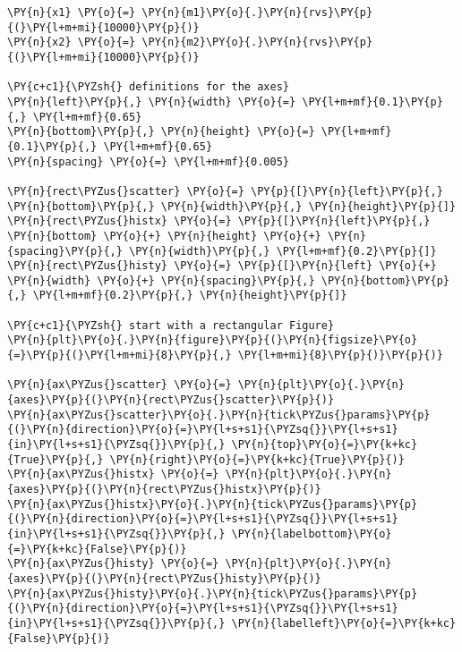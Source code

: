     \begin{tcolorbox}[breakable, size=fbox, boxrule=1pt, pad at break*=1mm,colback=cellbackground, colframe=cellborder]
\begin{Verbatim}[commandchars=\\\{\}]
\PY{n}{x1} \PY{o}{=} \PY{n}{m1}\PY{o}{.}\PY{n}{rvs}\PY{p}{(}\PY{l+m+mi}{10000}\PY{p}{)}
\PY{n}{x2} \PY{o}{=} \PY{n}{m2}\PY{o}{.}\PY{n}{rvs}\PY{p}{(}\PY{l+m+mi}{10000}\PY{p}{)}

\PY{c+c1}{\PYZsh{} definitions for the axes}
\PY{n}{left}\PY{p}{,} \PY{n}{width} \PY{o}{=} \PY{l+m+mf}{0.1}\PY{p}{,} \PY{l+m+mf}{0.65}
\PY{n}{bottom}\PY{p}{,} \PY{n}{height} \PY{o}{=} \PY{l+m+mf}{0.1}\PY{p}{,} \PY{l+m+mf}{0.65}
\PY{n}{spacing} \PY{o}{=} \PY{l+m+mf}{0.005}

\PY{n}{rect\PYZus{}scatter} \PY{o}{=} \PY{p}{[}\PY{n}{left}\PY{p}{,} \PY{n}{bottom}\PY{p}{,} \PY{n}{width}\PY{p}{,} \PY{n}{height}\PY{p}{]}
\PY{n}{rect\PYZus{}histx} \PY{o}{=} \PY{p}{[}\PY{n}{left}\PY{p}{,} \PY{n}{bottom} \PY{o}{+} \PY{n}{height} \PY{o}{+} \PY{n}{spacing}\PY{p}{,} \PY{n}{width}\PY{p}{,} \PY{l+m+mf}{0.2}\PY{p}{]}
\PY{n}{rect\PYZus{}histy} \PY{o}{=} \PY{p}{[}\PY{n}{left} \PY{o}{+} \PY{n}{width} \PY{o}{+} \PY{n}{spacing}\PY{p}{,} \PY{n}{bottom}\PY{p}{,} \PY{l+m+mf}{0.2}\PY{p}{,} \PY{n}{height}\PY{p}{]}

\PY{c+c1}{\PYZsh{} start with a rectangular Figure}
\PY{n}{plt}\PY{o}{.}\PY{n}{figure}\PY{p}{(}\PY{n}{figsize}\PY{o}{=}\PY{p}{(}\PY{l+m+mi}{8}\PY{p}{,} \PY{l+m+mi}{8}\PY{p}{)}\PY{p}{)}

\PY{n}{ax\PYZus{}scatter} \PY{o}{=} \PY{n}{plt}\PY{o}{.}\PY{n}{axes}\PY{p}{(}\PY{n}{rect\PYZus{}scatter}\PY{p}{)}
\PY{n}{ax\PYZus{}scatter}\PY{o}{.}\PY{n}{tick\PYZus{}params}\PY{p}{(}\PY{n}{direction}\PY{o}{=}\PY{l+s+s1}{\PYZsq{}}\PY{l+s+s1}{in}\PY{l+s+s1}{\PYZsq{}}\PY{p}{,} \PY{n}{top}\PY{o}{=}\PY{k+kc}{True}\PY{p}{,} \PY{n}{right}\PY{o}{=}\PY{k+kc}{True}\PY{p}{)}
\PY{n}{ax\PYZus{}histx} \PY{o}{=} \PY{n}{plt}\PY{o}{.}\PY{n}{axes}\PY{p}{(}\PY{n}{rect\PYZus{}histx}\PY{p}{)}
\PY{n}{ax\PYZus{}histx}\PY{o}{.}\PY{n}{tick\PYZus{}params}\PY{p}{(}\PY{n}{direction}\PY{o}{=}\PY{l+s+s1}{\PYZsq{}}\PY{l+s+s1}{in}\PY{l+s+s1}{\PYZsq{}}\PY{p}{,} \PY{n}{labelbottom}\PY{o}{=}\PY{k+kc}{False}\PY{p}{)}
\PY{n}{ax\PYZus{}histy} \PY{o}{=} \PY{n}{plt}\PY{o}{.}\PY{n}{axes}\PY{p}{(}\PY{n}{rect\PYZus{}histy}\PY{p}{)}
\PY{n}{ax\PYZus{}histy}\PY{o}{.}\PY{n}{tick\PYZus{}params}\PY{p}{(}\PY{n}{direction}\PY{o}{=}\PY{l+s+s1}{\PYZsq{}}\PY{l+s+s1}{in}\PY{l+s+s1}{\PYZsq{}}\PY{p}{,} \PY{n}{labelleft}\PY{o}{=}\PY{k+kc}{False}\PY{p}{)}


\end{Verbatim}
\end{tcolorbox}
